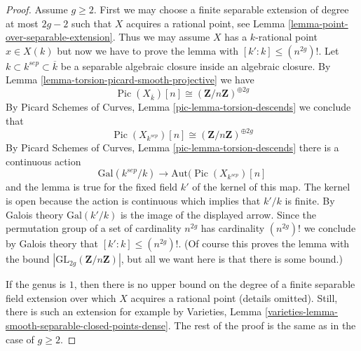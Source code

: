 \documentclass[10pt,a4paper]{amsart}
\theoremstyle{plain}
\theoremstyle{definition}
\theoremstyle{remark}
\numberwithin{equation}{subsection}
\def\Pic{\mathop{\mathrm{Pic}}\nolimits}
\begin{document}
\begin{proof}
Assume $g \geq 2$. First we may choose a finite separable extension
of degree at most $2g - 2$ such that $X$ acquires a rational point, see
Lemma \ref{lemma-point-over-separable-extension}.
Thus we may assume $X$ has a $k$-rational point $x \in X(k)$
but now we have to prove the lemma with
$[k' : k] \leq (n^{2g})!$.
Let $k \subset k^{sep} \subset \overline{k}$ be a separable algebraic
closure inside an algebraic closure.
By Lemma \ref{lemma-torsion-picard-smooth-projective} we have
$$
\Pic(X_{\overline{k}})[n] \cong (\mathbf{Z}/n\mathbf{Z})^{\oplus 2g}
$$
By Picard Schemes of Curves, Lemma \ref{pic-lemma-torsion-descends}
we conclude that
$$
\Pic(X_{k^{sep}})[n] \cong (\mathbf{Z}/n\mathbf{Z})^{\oplus 2g}
$$
By Picard Schemes of Curves, Lemma \ref{pic-lemma-torsion-descends}
there is a continuous action
$$
\text{Gal}(k^{sep}/k)
\longrightarrow
\text{Aut}(\Pic(X_{k^{sep}})[n]
$$
and the lemma is true for the fixed field $k'$ of the kernel of this map.
The kernel is open because the action is continuous which implies
that $k'/k$ is finite. By Galois theory $\text{Gal}(k'/k)$
is the image of the displayed arrow. Since the permutation
group of a set of cardinality $n^{2g}$ has cardinality $(n^{2g})!$
we conclude by Galois theory that $[k' : k] \leq (n^{2g})!$.
(Of course this proves the lemma with the bound
$|\text{GL}_{2g}(\mathbf{Z}/n\mathbf{Z})|$, but all we want
here is that there is some bound.)

\medskip\noindent
If the genus is $1$, then there is no upper bound on the degree of a
finite separable field extension over which $X$ acquires a rational point
(details omitted). Still, there is such an extension for example by
Varieties, Lemma \ref{varieties-lemma-smooth-separable-closed-points-dense}.
The rest of the proof is the same as in the case of $g \geq 2$.
\end{proof}
\end{document}
